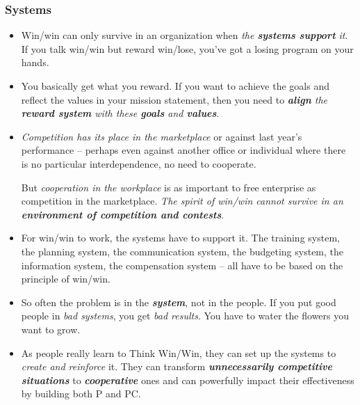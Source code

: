 \documentclass[11pt]{article}
\begin{document}
\subsubsection{Systems}
\begin{itemize}
\item Win/win can only survive in an organization when \emph{the \textbf{systems support} it}. If you talk win/win but reward win/lose, you've got a losing program on your hands.

\item You basically get what you reward. If you want to achieve the goals and reflect the values in your mission statement, then you need to \emph{\textbf{align} the \textbf{reward system} with these \textbf{goals} and \textbf{values}}.

\item \emph{Competition has its place in the marketplace} or against last year's performance -- perhaps even against another office or individual where there is no particular interdependence, no need to cooperate.

But \emph{cooperation in the workplace} is as important to free enterprise as competition in the marketplace. \emph{The spirit of win/win cannot survive in an \textbf{environment of competition and contests}}.

\item For win/win to work, the systems have to support it. The training system, the planning system, the communication system, the budgeting system, the information system, the compensation system -- all have to be based on the principle of win/win.

\item So often the problem is in the \textbf{\emph{system}}, not in the people. If you put good people in \emph{bad systems}, you get \emph{bad results}. You have to water the flowers you want to grow.

\item As people really learn to Think Win/Win, they can set up the systems to \emph{create and reinforce} it. They can transform \emph{\textbf{unnecessarily competitive situations}} to \emph{\textbf{cooperative}} ones and can powerfully impact their effectiveness by building both P and PC.
\end{itemize}
\end{document}
